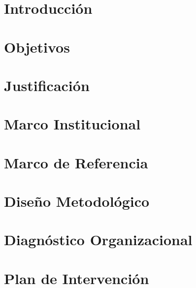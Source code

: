 \documentclass[12pt]{article}
\newcommand{\chapterbreak}{\clearpage \thispagestyle{fancy}}
\begin{document}
\chapterbreak
\tableofcontents
\newpage
\listoffigures
\listoftables


\chapterbreak
\section{Introducción}


\chapterbreak
\section{Objetivos}


\chapterbreak
\section{Justificación}


\chapterbreak
\section{Marco Institucional}



\chapterbreak
\section{Marco de Referencia}


\chapterbreak
\section{Diseño Metodológico}


\chapterbreak
\section{Diagnóstico Organizacional}


\chapterbreak
\section{Plan de Intervención}


\chapterbreak
\end{document}
